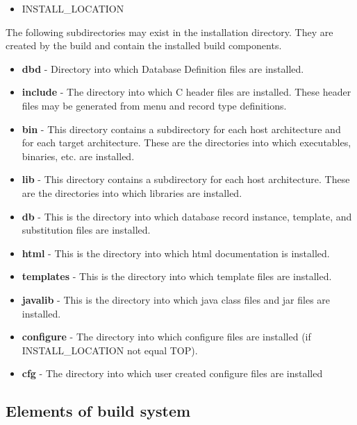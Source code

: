 \begin{itemize}\item {}INSTALL\_LOCATION

\end{itemize}The following subdirectories may exist in the installation directory. They are created by the build and contain the installed 
build components.

\begin{itemize}

\item {}\textbf{dbd} - Directory into which Database Definition files are installed.

\item {}\textbf{include} - The directory into which C header files are installed. These header files may be generated from menu and 
record type definitions.

\item {}\textbf{bin} - This directory contains a subdirectory for each host architecture and for each target architecture. These are the 
directories into which executables, binaries, etc. are installed.

\item {}\textbf{lib} - This directory contains a subdirectory for each host architecture. These are the directories into which libraries 
are installed.

\item {}\textbf{db} - This is the directory into which database record instance, template, and substitution files are installed.

\item {}\textbf{html} - This is the directory into which html documentation is installed.

\item {}\textbf{templates} - This is the directory into which template files are installed.

\item {}\textbf{javalib} - This is the directory into which java class files and jar files are installed.

\item {}\textbf{configure} - The directory into which configure files are installed (if INSTALL\_LOCATION not equal TOP).

\item {}\textbf{cfg} - The directory into which user created configure files are installed 

\end{itemize}\subsection{Elements of build system}


